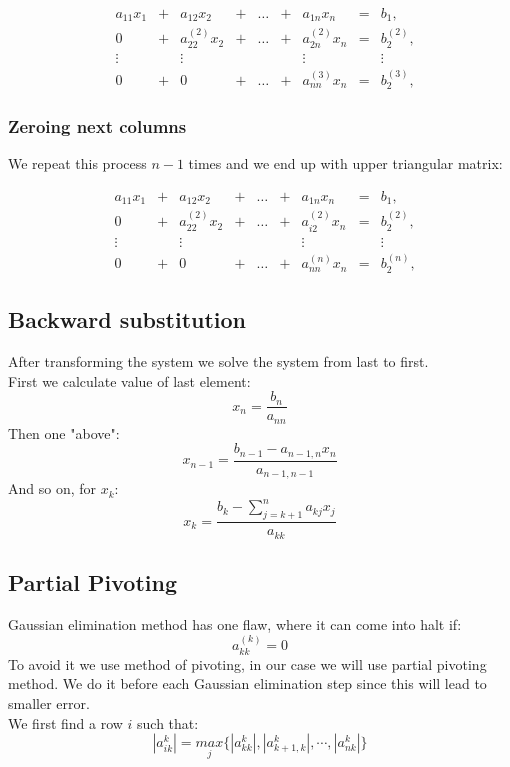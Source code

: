 \documentclass[12pt]{report}
\begin{document}
\[
\begin{matrix}

&a_{11}x_1 &{}+&a_{12}x_2&+&\dots&+&a_{1n}x_n &=&b_1,\\

&0 &{}+& a_{22}^{(2)}x_2&{}+&\dots&{}+& a_{2n}^{(2)}x_n &=&b_2^{(2)},\\

&\vdots    &&\vdots      & &     & &  \vdots  & &\vdots\\

&0 &{}+& 0 &{}+&\dots&{}+& a_{nn}^{(3)}x_n &=&b_2^{(3)},

\end{matrix}
\]

\subsubsection{Zeroing next columns}
We repeat this process $n-1$ times and we end up with upper triangular matrix:

\[
\begin{matrix}

&a_{11}x_1 &{}+&a_{12}x_2&+&\dots&+&a_{1n}x_n &=&b_1,\\

&0 &{}+& a_{22}^{(2)}x_2&{}+&\dots&{}+& a_{i2}^{(2)}x_n &=&b_2^{(2)},\\

&\vdots    &&\vdots      & &     & &  \vdots  & &\vdots\\

&0 &{}+& 0 &{}+&\dots&{}+& a_{nn}^{(n)}x_n &=&b_2^{(n)},

\end{matrix}
\]

\subsection{Backward substitution}
After transforming the system we solve the system from last to first. \\
First we calculate value of last element:
\[ x_n = \frac{b_n}{a_{nn}} \]
Then one "above":
\[ x_{n-1} = \frac{ b_{n-1} - a_{n-1, n}x_n}{a_{n-1, n-1}} \]
And so on, for $x_k$:
\[ x_{k} = \frac{b_k - \sum_{j = k + 1}^n a_{kj}x_j}{a_{kk}} \]

\newpage
\subsection{Partial Pivoting}
Gaussian elimination method has one flaw, where it can come into halt if:
\[ a_{kk}^{(k)} = 0 \]
To avoid it we use method of pivoting, in our case we will use partial pivoting method.
We do it before each Gaussian elimination step since this will lead to smaller error.
\\We first find a row $i$ such that:
\[ |{a_{ik}^{k}}| = \underset{j}{max} \{ |{a_{kk}^{k}}|, |{a_{k+1, k}^{k}}|, \cdots, |{a_{nk}^{k}}|\} \]
\end{document}
